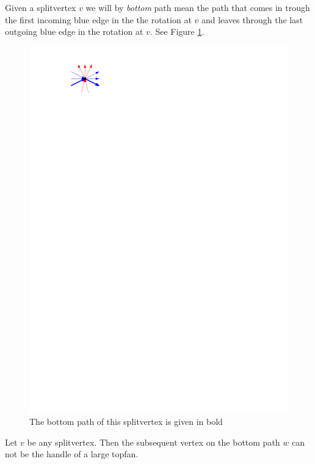     Given a splitvertex $v$ we will by \emph{bottom} path mean the path that comes in trough the first incoming blue edge in the the rotation at $v$ and leaves through the last outgoing blue edge in the rotation at $v$. See Figure \ref{fig:sweep:bottomPath}.

    \begin{figure}[h]
      \centering
      \includegraphics[scale=1]{unifiedAlgo/img/sweep/bottompath.pdf}
      \caption{The bottom path of this splitvertex is given in bold}
      \label{fig:sweep:bottomPath}
    \end{figure}

    \begin{lemma}
      \label{lm:sweep:NoTwoSplitsAboveEachOther}
      Let $v$ be any splitvertex. Then the subsequent vertex on the bottom path $w$ can not be the handle of a large topfan.
    \end{lemma}

